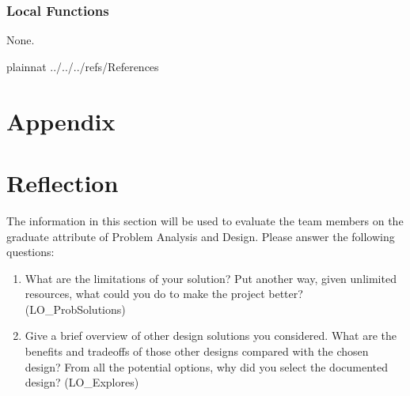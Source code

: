 \documentclass[12pt, titlepage]{article}
\begin{document}
\subsubsection{Local Functions}
None.



\newpage

 {plainnat}
 {../../../refs/References}

\newpage

\section{Appendix} \label{Appendix}


\section{Reflection}

The information in this section will be used to evaluate the team members on the
graduate attribute of Problem Analysis and Design.  Please answer the following questions:

\begin{enumerate}
  \item What are the limitations of your solution?  Put another way, given
  unlimited resources, what could you do to make the project better? (LO\_ProbSolutions)
  \item Give a brief overview of other design solutions you considered.  What
  are the benefits and tradeoffs of those other designs compared with the chosen
  design?  From all the potential options, why did you select the documented design?
  (LO\_Explores)
\end{enumerate}
\end{document}
